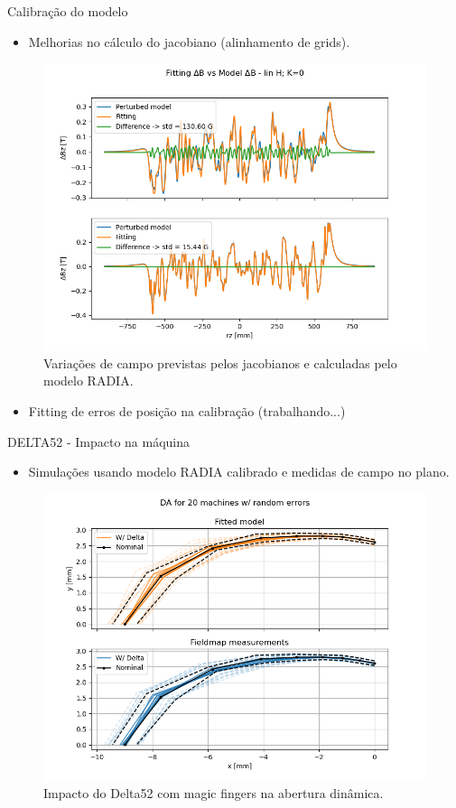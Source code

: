 \documentclass{beamer}					  %
\begin{document}
\begin{frame}{Calibração do modelo}
    \begin{itemize}
            \item Melhorias no cálculo do jacobiano (alinhamento de grids).
    \end{itemize}
    \begin{figure}[H]
    		\centering
            \includegraphics[width=.7\textwidth]{2023-10-27/figures/New_jacobian_test.png}
            \caption{Variações de campo previstas pelos jacobianos e calculadas pelo modelo RADIA.}
            \label{fig:jac_comparison}
    \end{figure}
    \begin{itemize}
            \item Fitting de erros de posição na calibração (trabalhando...)
    \end{itemize}
\end{frame}

\begin{frame}{DELTA52 - Impacto na máquina}
\begin{itemize}
        \item Simulações usando modelo RADIA calibrado e medidas de campo no plano.
	\end{itemize}
\begin{figure}[H]
		\centering
        \includegraphics[width=.8\textwidth]{2023-10-27/figures/dynapt_delta.png}
        \caption{Impacto do Delta52 com magic fingers na abertura dinâmica.}
        \label{fig:dynapt}
    \end{figure}
\end{frame}
\end{document}
